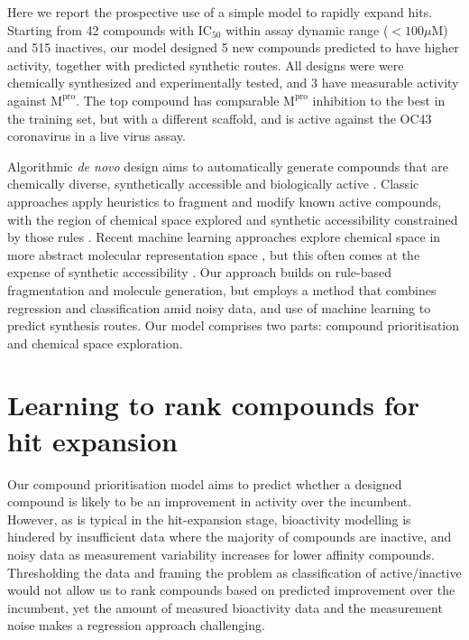 Here we report the prospective use of a simple model to rapidly expand hits. Starting from 42 compounds with $\mathrm{IC}_{50}$ within assay dynamic range ($<100 \mu$M) and 515 inactives, our model designed 5 new compounds predicted to have higher activity, together with predicted synthetic routes. All designs were were chemically synthesized and experimentally tested, and 3 have measurable activity against $\mathrm{M}^\mathrm{pro}$. The top compound has comparable $\mathrm{M}^\mathrm{pro}$ inhibition to the best in the training set, but with a different scaffold, and is active against the OC43 coronavirus in a live virus assay. 

Algorithmic \emph{de novo} design aims to automatically generate compounds that are chemically diverse, synthetically accessible and biologically active \cite{schneider2016novo}. Classic approaches apply heuristics to fragment and modify known active compounds, with the region of chemical space explored and synthetic accessibility constrained by those rules \cite{brown2004graph,patel2009knowledge,hartenfeller2012dogs}. Recent machine learning approaches explore chemical space in more abstract molecular representation space \cite{gomez2018automatic,segler2018generating}, but this often comes at the expense of synthetic accessibility \cite{Gao2020Synthesizability}. Our approach builds on rule-based fragmentation and molecule generation, but employs a method that combines regression and classification amid noisy data, and use of machine learning to predict synthesis routes. Our model comprises two parts: compound prioritisation and chemical space exploration. 

\section{Learning to rank compounds for hit expansion}
Our compound prioritisation model aims to predict whether a designed compound is likely to be an improvement in activity over the incumbent. However, as is typical in the hit-expansion stage, bioactivity modelling is hindered by insufficient data where the majority of compounds are inactive, and noisy data as measurement variability increases for lower affinity compounds. Thresholding the data and framing the problem as classification of active/inactive would not allow us to rank compounds based on predicted improvement over the incumbent, yet the amount of measured bioactivity data and the measurement noise makes a regression approach challenging.

